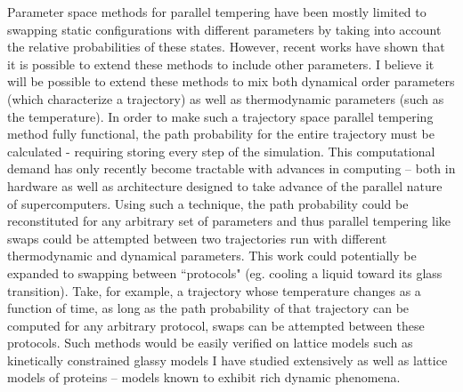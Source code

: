 \documentclass[11pt]{article}
\newcommand{\kB}{k_{\mathrm{B}}}
\begin{document}
Parameter space methods for parallel tempering %
have been mostly limited to swapping static configurations with different parameters by taking into account the relative probabilities of these states.  However, recent works have shown that it is possible to extend these methods to include other parameters. I believe it will be possible to extend these methods to mix both dynamical order parameters (which characterize a trajectory) as well as thermodynamic parameters (such as the temperature).  In order to make such a trajectory space parallel tempering method fully functional, the path probability for the entire trajectory must be calculated - requiring storing every step of the simulation.  This computational demand has only recently become tractable with advances in computing -- both in hardware as well as architecture designed to take advance of the parallel nature of supercomputers.   Using such a technique, the path probability could be reconstituted for any arbitrary set of parameters and thus parallel tempering like swaps could be attempted between two trajectories run with different thermodynamic and dynamical parameters.  This work could potentially be expanded to swapping between ``protocols" (eg. cooling a liquid toward its glass transition). Take, for example, a trajectory whose temperature changes as a function of time, as long as the path probability of that trajectory can be computed for any arbitrary protocol, swaps can be attempted between these protocols.  Such methods would be easily verified on lattice models such as kinetically constrained glassy models I have studied extensively as well as lattice models of proteins -- models known to exhibit rich dynamic phenomena.  

\end{document}

